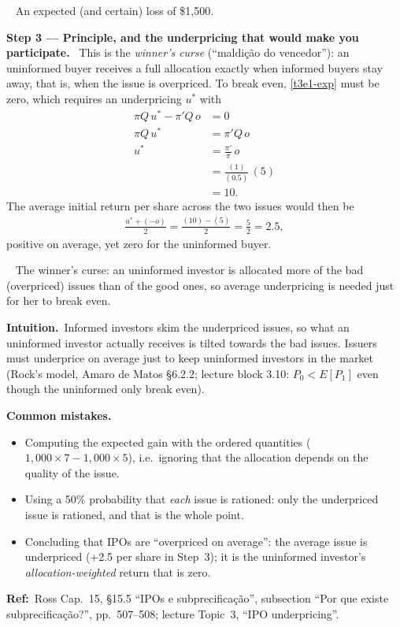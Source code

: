 \documentclass[11pt,a4paper]{article}
\newcommand{\step}[2]{\par\medskip\noindent\textbf{Step #1 --- #2.}~}
\newcommand{\intuition}{\par\medskip\noindent\textbf{Intuition.}~}
\newcommand{\refbib}{\par\smallskip\noindent\textbf{Ref:}~}
\newcommand{\pt}{\foreignlanguage{brazilian}}
\newcommand{\answer}[1]{\par\smallskip\noindent\fbox{\textbf{Answer #1.}}~}
\newcommand{\pitfalls}{\par\medskip\noindent\textbf{Common mistakes.}}
\begin{document}
\answer{(b)} An expected (and certain) loss of \$1{,}500.

\step{3}{Principle, and the underpricing that would make you participate} This is the \emph{winner's curse} (\pt{``maldi\c{c}\~ao do vencedor''}): an uninformed buyer receives a full allocation exactly when informed buyers stay away, that is, when the issue is overpriced. To break even, \eqref{t3e1-exp} must be zero, which requires an underpricing $u^{*}$ with
\begin{align}
  \pi Q\,u^{*} - \pi' Q\,o &= 0 \nonumber\\
  \pi Q\,u^{*} &= \pi' Q\,o \nonumber\\
  u^{*} &= \frac{\pi'}{\pi}\,o \label{t3e1-ustar}\\
        &= \frac{(1)}{(0.5)}\,(5) \nonumber\\
        &= 10. \nonumber
\end{align}
The average initial return per share across the two issues would then be
\begin{align}
  \frac{u^{*}+(-o)}{2} = \frac{(10)-(5)}{2} = \frac{5}{2} = 2.5, \nonumber
\end{align}
positive on average, yet zero for the uninformed buyer.

\answer{(c)} The winner's curse: an uninformed investor is allocated more of the bad (overpriced) issues than of the good ones, so average underpricing is needed just for her to break even.

\intuition Informed investors skim the underpriced issues, so what an uninformed investor actually receives is tilted towards the bad issues. Issuers must underprice on average just to keep uninformed investors in the market (Rock's model, Amaro de Matos \S6.2.2; lecture block 3.10: $P_0<E[P_1]$ even though the uninformed only break even).

\pitfalls
\begin{itemize}
  \item Computing the expected gain with the ordered quantities ($1{,}000\times7-1{,}000\times5$), i.e.\ ignoring that the allocation depends on the quality of the issue.
  \item Using a 50\% probability that \emph{each} issue is rationed: only the underpriced issue is rationed, and that is the whole point.
  \item Concluding that IPOs are ``overpriced on average'': the average issue is underpriced (+2.5 per share in Step~3); it is the uninformed investor's \emph{allocation-weighted} return that is zero.
\end{itemize}
\refbib{Ross Cap.~15, \S15.5 ``IPOs e subprecifica\c{c}\~ao'', subsection ``Por que existe subprecifica\c{c}\~ao?'', pp.~507--508; lecture Topic~3, ``IPO underpricing''.}
\end{document}
